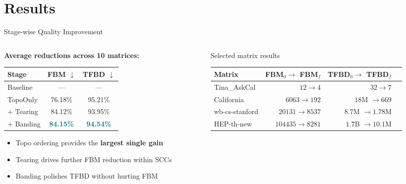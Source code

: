\documentclass[aspectratio=169]{beamer}
\newcommand{\highlight}[1]{\textcolor{teal}{\textbf{#1}}}
\begin{document}
\section{Results}

\begin{frame}{Stage-wise Quality Improvement}
  \begin{columns}[T]
    \begin{column}{0.42\textwidth}
      \textbf{Average reductions across 10 matrices:}
      \vspace{0.3em}
      \begin{tabular}{lcc}
        \toprule
        Stage & FBM $\downarrow$ & TFBD $\downarrow$ \\
        \midrule
        Baseline       & ---      & ---     \\
        TopoOnly       & 76.18\%  & 95.21\% \\
        + Tearing      & 84.12\%  & 93.95\% \\
        + Banding      & \highlight{84.15\%}  & \highlight{94.54\%} \\
        \bottomrule
      \end{tabular}
      \vspace{0.5em}
      \begin{itemize}
        \item Topo ordering provides the \textbf{largest single gain}
        \item Tearing drives further FBM reduction within SCCs
        \item Banding polishes TFBD without hurting FBM
      \end{itemize}
    \end{column}
    \begin{column}{0.55\textwidth}
      \begin{block}{Selected matrix results}
        \small
        \begin{tabular}{lrrr}
          \toprule
          Matrix & FBM$_0 \to$ FBM$_f$ & TFBD$_0 \to$ TFBD$_f$ \\
          \midrule
          Tina\_AskCal & $12 \to 4$       & $32 \to 7$ \\
          California   & $6063 \to 192$   &$18$M $\to 669$\\
          wb-cs-stanford & $20131 \to 8537$ & $8.7$M $\to 1.78$M\\
	  HEP-th-new   & $104435 \to 8281$ & $1.7$B $\to 10.1$M \\
          \bottomrule
        \end{tabular}
      \end{block}
    \end{column}
  \end{columns}
\end{frame}
\end{document}
